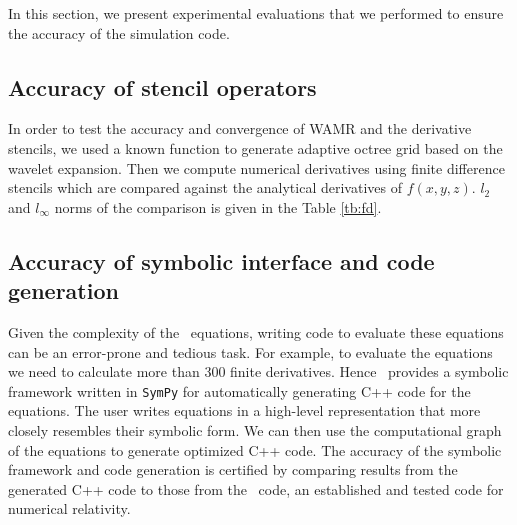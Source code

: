 \def\TT{{\rm time}}
\def\SS{{\rm step}}

In this section, we present experimental evaluations that we performed to ensure the accuracy of the simulation code. 

\subsection{Accuracy of stencil operators}

In order to test the accuracy and convergence of WAMR and the derivative stencils, we used a known function to generate adaptive octree grid based on the wavelet expansion. 
Then we compute numerical derivatives using finite difference stencils which are compared against the analytical derivatives of $f(x,y,z)$. $l_2$ and $l_{\infty}$ norms of the comparison is given in the Table \ref{tb:fd}. 

\begin{table}
	\centering
	\caption{Normed difference in numerical derivative and analytical derivative evaluated at grid points for the function $f(x,y,z)=sin(2\pi x)sin(2\pi y)sin(2\pi z))$%
	where in both cases wavelet tolerance 
	of $10^{-8}$ but increasing maximum level of refinement (i.e. \texttt{maxDepth}) from $4$ to $6$. Note that when \texttt{maxDepth} increases number of grid points increase hence normed difference between numerical and analytical derivatives goes down significantly. }
	\label{tb:fd}
\end{table}





\subsection{Accuracy of symbolic interface and code generation}

Given the complexity of the \BSSN\ equations, writing code to
evaluate these equations can be an error-prone and tedious task.
For example, to evaluate the equations we need to calculate more than 300
finite derivatives. Hence \dendro\ provides a symbolic framework
written in \texttt{SymPy} for automatically generating C++ code for
the equations. The user writes equations in a high-level representation 
that more closely resembles their symbolic form. 
We can then use the computational graph
of the equations to generate optimized C++ code. The accuracy
of the symbolic framework and code generation is certified by comparing 
results from the generated C++ code to those from 
the \HAD\ code, an established and tested code for numerical relativity.

